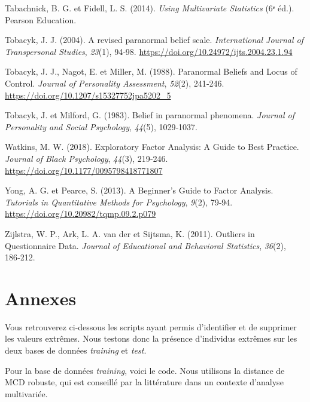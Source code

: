 \documentclass[
  french,
  11pt,
  a4paper,
]{article}
\newlength{\cslhangindent}
\newenvironment{CSLReferences}[2] %
 {\begin{list}{}{%
  \setlength{\itemindent}{0pt}
  \setlength{\leftmargin}{0pt}
  \setlength{\parsep}{0pt}
  \ifodd #1
   \setlength{\leftmargin}{\cslhangindent}
   \setlength{\itemindent}{-1\cslhangindent}
  \fi
  \setlength{\itemsep}{#2\baselineskip}}}
 {\end{list}}
\begin{document}
\begin{CSLReferences}{1}{0}
Tabachnick, B. G. et Fidell, L. S. (2014). \emph{Using Multivariate
Statistics} (6ᵉ éd.). Pearson Education.

Tobacyk, J. J. (2004). A revised paranormal belief scale.
\emph{International Journal of Transpersonal Studies}, \emph{23}(1),
94‑98. \url{https://doi.org/10.24972/ijts.2004.23.1.94}

Tobacyk, J. J., Nagot, E. et Miller, M. (1988). Paranormal Beliefs and
Locus of Control. \emph{Journal of Personality Assessment},
\emph{52}(2), 241‑246. \url{https://doi.org/10.1207/s15327752jpa5202_5}

Tobacyk, J. et Milford, G. (1983). Belief in paranormal phenomena.
\emph{Journal of Personality and Social Psychology}, \emph{44}(5),
1029‑1037.

Watkins, M. W. (2018). Exploratory Factor Analysis: A Guide to Best
Practice. \emph{Journal of Black Psychology}, \emph{44}(3), 219‑246.
\url{https://doi.org/10.1177/0095798418771807}

Yong, A. G. et Pearce, S. (2013). A Beginner's Guide to Factor Analysis.
\emph{Tutorials in Quantitative Methods for Psychology}, \emph{9}(2),
79‑94. \url{https://doi.org/10.20982/tqmp.09.2.p079}

Zijlstra, W. P., Ark, L. A. van der et Sijtsma, K. (2011). Outliers in
Questionnaire Data. \emph{Journal of Educational and Behavioral
Statistics}, \emph{36}(2), 186‑212.

\end{CSLReferences}

\section*{Annexes}\label{annexes}

Vous retrouverez ci-dessous les scripts ayant permis d'identifier et de
supprimer les valeurs extrêmes. Nous testons donc la présence
d'individus extrêmes sur les deux bases de données \emph{training} et
\emph{test}.

Pour la base de données \emph{training}, voici le code. Nous utilisons
la distance de MCD robuste, qui est conseillé par la littérature dans un
contexte d'analyse multivariée.
\end{document}
